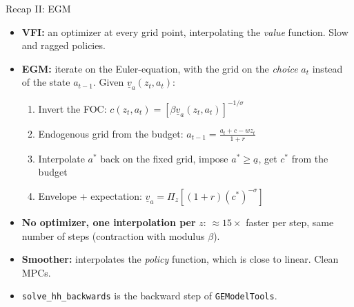 \documentclass[
  10pt,
  ignorenonframetext,
  aspectratio=43,
  english,
  handout]{beamer}
\providecommand{\tightlist}{%
  \setlength{\itemsep}{0pt}\setlength{\parskip}{0pt}}
\begin{document}
\begin{frame}[fragile]{Recap II: EGM}
\protect{}\label{recap-ii-egm}
\begin{itemize}
\tightlist
\item
  \textbf{VFI:} an optimizer at every grid point, interpolating the \emph{value} function. Slow and ragged policies.
\item
  \textbf{EGM:} iterate on the Euler-equation, with the grid on the \emph{choice} \(a_{t}\) instead of the state \(a_{t-1}\). Given \(\underline{v}_{a}(z_{t},a_{t})\):

  \begin{enumerate}
  \tightlist
  \item
    Invert the FOC: \(c(z_{t},a_{t})=\left[\beta\underline{v}_{a}(z_{t},a_{t})\right]^{-1/\sigma}\)
  \item
    Endogenous grid from the budget: \(a_{t-1}=\frac{a_{t}+c-wz_{t}}{1+r}\)
  \item
    Interpolate \(a^{\ast}\) back on the fixed grid, impose \(a^{\ast}\geq\underline{a}\), get \(c^{\ast}\) from the budget
  \item
    Envelope + expectation: \(\underline{v}_{a}=\Pi_{z}\left[(1+r)(c^{\ast})^{-\sigma}\right]\)
  \end{enumerate}
\item
  \textbf{No optimizer, one interpolation per} \(z\): \(\approx15\times\) faster per step, same number of steps (contraction with modulus \(\beta\)).
\item
  \textbf{Smoother:} interpolates the \emph{policy} function, which is close to linear. Clean MPCs.
\item
  \texttt{solve\_hh\_backwards} is the backward step of \texttt{GEModelTools}.
\end{itemize}
\end{frame}
\end{document}
